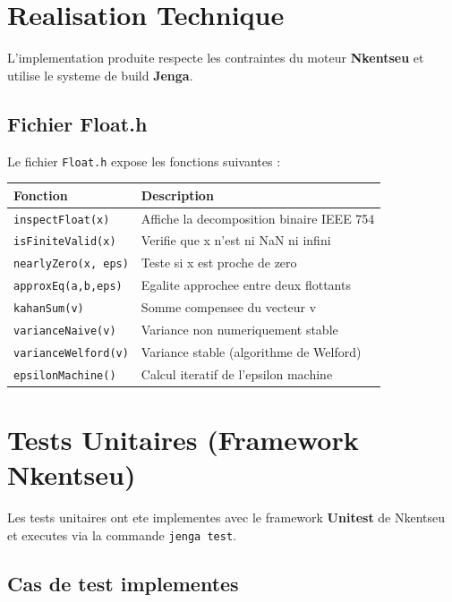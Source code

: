 \documentclass[12pt,a4paper]{article}
\begin{document}
\section{Realisation Technique}

L'implementation produite respecte les contraintes du moteur \textbf{Nkentseu} et utilise
le systeme de build \textbf{Jenga}.

\subsection{Fichier Float.h}

Le fichier \texttt{Float.h} expose les fonctions suivantes :

\begin{center}
\begin{tabular}{lp{8cm}}
    \toprule
    \textbf{Fonction} & \textbf{Description} \\
    \midrule
    \texttt{inspectFloat(x)} & Affiche la decomposition binaire IEEE 754 \\
    \texttt{isFiniteValid(x)} & Verifie que x n'est ni NaN ni infini \\
    \texttt{nearlyZero(x, eps)} & Teste si x est proche de zero \\
    \texttt{approxEq(a,b,eps)} & Egalite approchee entre deux flottants \\
    \texttt{kahanSum(v)} & Somme compensee du vecteur v \\
    \texttt{varianceNaive(v)} & Variance non numeriquement stable \\
    \texttt{varianceWelford(v)} & Variance stable (algorithme de Welford) \\
    \texttt{epsilonMachine()} & Calcul iteratif de l'epsilon machine \\
    \bottomrule
\end{tabular}
\end{center}

\section{Tests Unitaires (Framework Nkentseu)}

Les tests unitaires ont ete implementes avec le framework \textbf{Unitest} de Nkentseu
et executes via la commande \texttt{jenga test}.

\subsection{Cas de test implementes}
\end{document}
